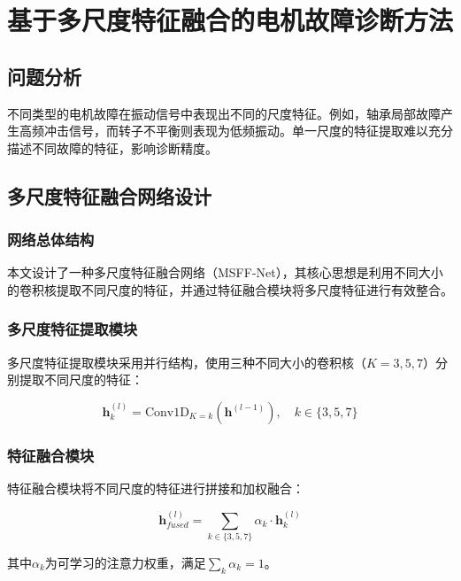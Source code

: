 \chapter{基于多尺度特征融合的电机故障诊断方法}

\section{问题分析}

不同类型的电机故障在振动信号中表现出不同的尺度特征。例如，轴承局部故障产生高频冲击信号，而转子不平衡则表现为低频振动。单一尺度的特征提取难以充分描述不同故障的特征，影响诊断精度。

\section{多尺度特征融合网络设计}

\subsection{网络总体结构}

本文设计了一种多尺度特征融合网络（MSFF-Net），其核心思想是利用不同大小的卷积核提取不同尺度的特征，并通过特征融合模块将多尺度特征进行有效整合。

\subsection{多尺度特征提取模块}

多尺度特征提取模块采用并行结构，使用三种不同大小的卷积核（$K=3, 5, 7$）分别提取不同尺度的特征：

\begin{equation}
	\mathbf{h}_k^{(l)} = \text{Conv1D}_{K=k}\left(\mathbf{h}^{(l-1)}\right), \quad k \in \{3, 5, 7\}
	\label{eq:multiscale}
\end{equation}

\subsection{特征融合模块}

特征融合模块将不同尺度的特征进行拼接和加权融合：

\begin{equation}
	\mathbf{h}_{fused}^{(l)} = \sum_{k \in \{3,5,7\}} \alpha_k \cdot \mathbf{h}_k^{(l)}
	\label{eq:fusion}
\end{equation}

其中$\alpha_k$为可学习的注意力权重，满足$\sum_k \alpha_k = 1$。

